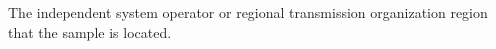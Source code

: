 The independent system operator or regional transmission organization region that the sample is located.
